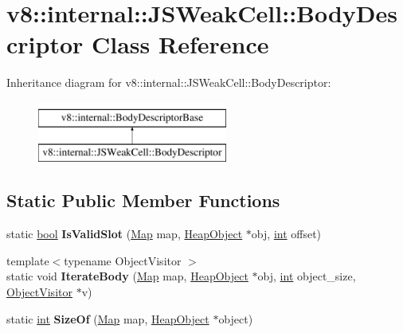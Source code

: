\hypertarget{classv8_1_1internal_1_1JSWeakCell_1_1BodyDescriptor}{}\section{v8\+:\+:internal\+:\+:J\+S\+Weak\+Cell\+:\+:Body\+Descriptor Class Reference}
\label{classv8_1_1internal_1_1JSWeakCell_1_1BodyDescriptor}
Inheritance diagram for v8\+:\+:internal\+:\+:J\+S\+Weak\+Cell\+:\+:Body\+Descriptor\+:\begin{figure}[H]
\begin{center}
\leavevmode
\includegraphics[height=2.000000cm]{classv8_1_1internal_1_1JSWeakCell_1_1BodyDescriptor}
\end{center}
\end{figure}
\subsection*{Static Public Member Functions}
\begin{DoxyCompactItemize}
\item 
\mbox{\label{classv8_1_1internal_1_1JSWeakCell_1_1BodyDescriptor_a01f2ccae28f7eea61851d1d20286f821}} 
static \mbox{\hyperlink{classbool}{bool}} {\bfseries Is\+Valid\+Slot} (\mbox{\hyperlink{classv8_1_1internal_1_1Map}{Map}} map, \mbox{\hyperlink{classv8_1_1internal_1_1HeapObject}{Heap\+Object}} $\ast$obj, \mbox{\hyperlink{classint}{int}} offset)
\item 
\mbox{\label{classv8_1_1internal_1_1JSWeakCell_1_1BodyDescriptor_af2ac969de99b9617391deb6620e8f8cb}} 
{\footnotesize template$<$typename Object\+Visitor $>$ }\\static void {\bfseries Iterate\+Body} (\mbox{\hyperlink{classv8_1_1internal_1_1Map}{Map}} map, \mbox{\hyperlink{classv8_1_1internal_1_1HeapObject}{Heap\+Object}} $\ast$obj, \mbox{\hyperlink{classint}{int}} object\+\_\+size, \mbox{\hyperlink{classv8_1_1internal_1_1ObjectVisitor}{Object\+Visitor}} $\ast$v)
\item 
\mbox{\label{classv8_1_1internal_1_1JSWeakCell_1_1BodyDescriptor_a3df573efc97f44f0c21a4e5a2aa73a22}} 
static \mbox{\hyperlink{classint}{int}} {\bfseries Size\+Of} (\mbox{\hyperlink{classv8_1_1internal_1_1Map}{Map}} map, \mbox{\hyperlink{classv8_1_1internal_1_1HeapObject}{Heap\+Object}} $\ast$object)
\end{DoxyCompactItemize}
